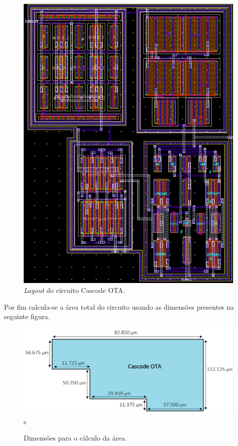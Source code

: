 \documentclass[11pt]{article}
\numberwithin{equation}{section}
\begin{document}
\begin{figure}[H]
	\centering
	\includegraphics[keepaspectratio=true, scale=0.75]{exps/layout/full}
	\vspace{-0.5em}
	\caption{\textit{Layout} do circuito Cascode OTA.}
	\vspace{-0.8em} 
\end{figure}

\pagebreak

Por fim calcula-se a área total do circuito usando as dimensões presentes na seguinte figura.

\begin{figure}[H]
	\centering
	\includegraphics[keepaspectratio=true, scale=0.40]{teoricas/area}s
	\vspace{-0.5em}
	\caption{Dimensões para o cálculo da área.}
	\vspace{-0.8em} 
\end{figure}
\end{document}
